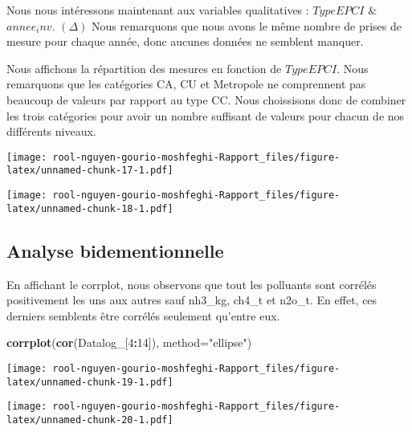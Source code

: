 \documentclass[
]{article}
\newenvironment{Shaded}{\begin{snugshade}}{\end{snugshade}}
\newcommand{\AttributeTok}[1]{\textcolor[rgb]{0.13,0.29,0.53}{#1}}
\newcommand{\DecValTok}[1]{\textcolor[rgb]{0.00,0.00,0.81}{#1}}
\newcommand{\FunctionTok}[1]{\textcolor[rgb]{0.13,0.29,0.53}{\textbf{#1}}}
\newcommand{\NormalTok}[1]{#1}
\newcommand{\SpecialCharTok}[1]{\textcolor[rgb]{0.81,0.36,0.00}{\textbf{#1}}}
\newcommand{\StringTok}[1]{\textcolor[rgb]{0.31,0.60,0.02}{#1}}
\begin{document}
Nous nous intéressons maintenant aux variables qualitatives :
\(TypeEPCI\) \& \(annee_inv\). \((\Delta)\) Nous remarquons que nous
avons le même nombre de prises de mesure pour chaque année, donc aucunes
données ne semblent manquer.

Nous affichons la répartition des mesures en fonction de \(TypeEPCI\).
Nous remarquons que les catégories CA, CU et Metropole ne comprennent
pas beaucoup de valeurs par rapport au type CC. Nous choissisons donc de
combiner les trois catégories pour avoir un nombre suffisant de valeurs
pour chacun de nos différents niveaux.

\texttt{[image: rool-nguyen-gourio-moshfeghi-Rapport\_files/figure-latex/unnamed-chunk-17-1.pdf]}

\texttt{[image: rool-nguyen-gourio-moshfeghi-Rapport\_files/figure-latex/unnamed-chunk-18-1.pdf]}

\hypertarget{analyse-bidementionnelle}{%
\subsection{Analyse bidementionnelle}\label{analyse-bidementionnelle}}

En affichant le corrplot, nous observons que tout les polluants sont
corrélés positivement les uns aux autres sauf nh3\_kg, ch4\_t et n2o\_t.
En effet, ces derniers semblents être corrélés seulement qu'entre eux.

\begin{Shaded}
\begin{Highlighting}[]
\FunctionTok{corrplot}\NormalTok{(}\FunctionTok{cor}\NormalTok{(Datalog\_[}\DecValTok{4}\SpecialCharTok{:}\DecValTok{14}\NormalTok{]), }\AttributeTok{method=}\StringTok{"ellipse"}\NormalTok{)}
\end{Highlighting}
\end{Shaded}

\texttt{[image: rool-nguyen-gourio-moshfeghi-Rapport\_files/figure-latex/unnamed-chunk-19-1.pdf]}

\begin{Shaded}
\end{Shaded}

\texttt{[image: rool-nguyen-gourio-moshfeghi-Rapport\_files/figure-latex/unnamed-chunk-20-1.pdf]}
\end{document}

